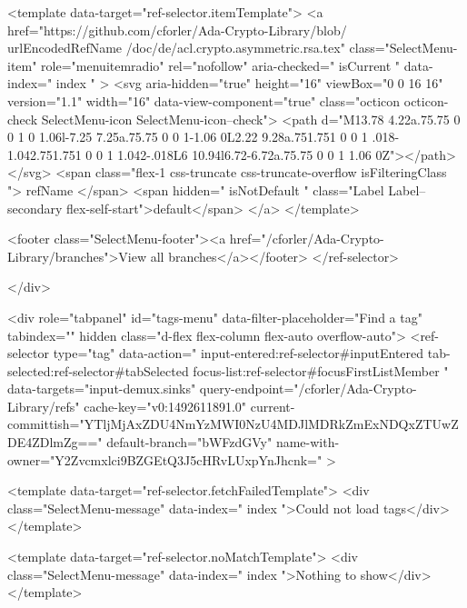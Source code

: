 <template data-target="ref-selector.itemTemplate">
  <a href="https://github.com/cforler/Ada-Crypto-Library/blob/{{ urlEncodedRefName }}/doc/de/acl.crypto.asymmetric.rsa.tex" class="SelectMenu-item" role="menuitemradio" rel="nofollow" aria-checked="{{ isCurrent }}" data-index="{{ index }}" >
    <svg aria-hidden="true" height="16" viewBox="0 0 16 16" version="1.1" width="16" data-view-component="true" class="octicon octicon-check SelectMenu-icon SelectMenu-icon--check">
    <path d="M13.78 4.22a.75.75 0 0 1 0 1.06l-7.25 7.25a.75.75 0 0 1-1.06 0L2.22 9.28a.751.751 0 0 1 .018-1.042.751.751 0 0 1 1.042-.018L6 10.94l6.72-6.72a.75.75 0 0 1 1.06 0Z"></path>
</svg>
    <span class="flex-1 css-truncate css-truncate-overflow {{ isFilteringClass }}">{{ refName }}</span>
    <span hidden="{{ isNotDefault }}" class="Label Label--secondary flex-self-start">default</span>
  </a>
</template>


              <footer class="SelectMenu-footer"><a href="/cforler/Ada-Crypto-Library/branches">View all branches</a></footer>
          </ref-selector>

        </div>

        <div role="tabpanel" id="tags-menu" data-filter-placeholder="Find a tag" tabindex="" hidden class="d-flex flex-column flex-auto overflow-auto">
          <ref-selector
            type="tag"
            data-action="
              input-entered:ref-selector#inputEntered
              tab-selected:ref-selector#tabSelected
              focus-list:ref-selector#focusFirstListMember
            "
            data-targets="input-demux.sinks"
            query-endpoint="/cforler/Ada-Crypto-Library/refs"
            cache-key="v0:1492611891.0"
            current-committish="YTljMjAxZDU4NmYzMWI0NzU4MDJlMDRkZmExNDQxZTUwZDE4ZDlmZg=="
            default-branch="bWFzdGVy"
            name-with-owner="Y2Zvcmxlci9BZGEtQ3J5cHRvLUxpYnJhcnk="
          >

            <template data-target="ref-selector.fetchFailedTemplate">
              <div class="SelectMenu-message" data-index="{{ index }}">Could not load tags</div>
            </template>

            <template data-target="ref-selector.noMatchTemplate">
              <div class="SelectMenu-message" data-index="{{ index }}">Nothing to show</div>
            </template>

              

